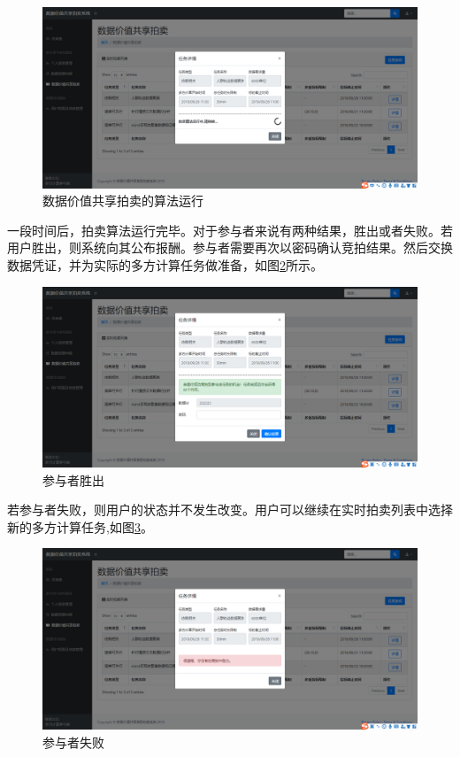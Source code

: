\documentclass[promaster]{thesis-uestc}
\begin{document}
\begin{figure}[H]
    \includegraphics[width=400pt]{ui/paimaiyunxing.png}
    \caption{数据价值共享拍卖的算法运行}
    \label{paimaiyunxing}
\end{figure}

一段时间后，拍卖算法运行完毕。对于参与者来说有两种结果，胜出或者失败。若用户胜出，则系统向其公布报酬。参与者需要再次以密码确认竞拍结果。然后交换数据凭证，并为实际的多方计算任务做准备，如图\ref{paimaichenggong}所示。

\begin{figure}[H]
    \includegraphics[width=400pt]{ui/paimaichenggong.png}
    \caption{参与者胜出}
    \label{paimaichenggong}
\end{figure}

若参与者失败，则用户的状态并不发生改变。用户可以继续在实时拍卖列表中选择新的多方计算任务,如图\ref{paimaishibai}。

\begin{figure}[H]
    \includegraphics[width=400pt]{ui/paimaishibai.png}
    \caption{参与者失败}
    \label{paimaishibai}
\end{figure}
\end{document}
